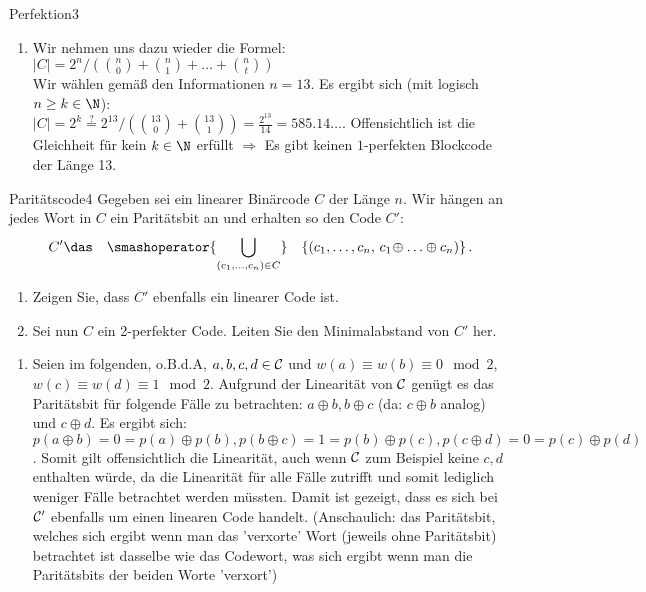 \begin{aufgabe}{Perfektion}{3}
\begin{enumerate}[label=\alph*)]
    \item Wir nehmen uns dazu wieder die Formel:  \\
    \(|C| = 2^n \Big/ \left(\binom{n}{0} + \binom{n}{1} + \ldots + \binom{n}{t}\right)\) \\
    Wir wählen gemäß den Informationen \(n=13\). Es ergibt sich (mit logisch \(n \geq k \in \N\)): \\
    \(|C| = 2^k \overset{?}{=} 2^{13} \Big/ \left(\binom{13}{0} + \binom{13}{1}\right) = \frac{2^{13}}{14} = 585.14 \ldots\). Offensichtlich ist die Gleichheit für kein \(k \in \N\) erfüllt \(\Rightarrow\) Es gibt keinen \(1\)-perfekten Blockcode der Länge 13. 
\end{enumerate}
\end{aufgabe}
\clearpage
\begin{aufgabe}{Paritätscode}{4}
Gegeben sei ein linearer Binärcode \(C\) der Länge \(n\). Wir hängen an jedes
Wort in \(C\) ein Paritätsbit an und erhalten so den Code \(C'\):
\[
    C' \das \quad\smashoperator{\bigcup_{\substack{(c_1,...,c_n)\in
    C}}}\quad \{(c_1,\dots,c_n,\,c_1\!\oplus \ldots \oplus c_n)\} \,.
\]
\begin{enumerate}[label=\alph*)]
\narrowitems
    \item Zeigen Sie, dass \(C'\) ebenfalls ein linearer Code ist.
    \item Sei nun \(C\) ein 2-perfekter Code.
        Leiten Sie den Minimalabstand von \(C'\) her.
\end{enumerate}
\Splitter
\begin{enumerate}[label=\alph*)]\narrowitems
    \item Seien im folgenden, o.B.d.A, \(a,b,c,d \in {\cal C}\) und \(w(a) \equiv w(b) \equiv 0 \mod 2\), \(w(c) \equiv w(d) \equiv 1 \mod 2\). Aufgrund der Linearität von \({\cal C}\) genügt es das Paritätsbit für folgende Fälle zu betrachten: \(a \oplus b, b \oplus c\) (da: \(c \oplus b\) analog) und \(c \oplus d\). Es ergibt sich:\\
    \(p(a\oplus b) = 0 = p(a) \oplus p(b), p(b \oplus c) = 1 = p(b) \oplus p(c), p(c \oplus d) = 0 = p(c) \oplus p(d)\). Somit gilt offensichtlich die Linearität, auch wenn \({\cal C}\) zum Beispiel keine \(c,d\) enthalten würde, da die Linearität für alle Fälle zutrifft und somit lediglich weniger Fälle betrachtet werden müssten. Damit ist gezeigt, dass es sich bei \({\cal C}'\) ebenfalls um einen linearen Code handelt. (Anschaulich: das Paritätsbit, welches sich ergibt wenn man das 'verxorte' Wort (jeweils ohne Paritätsbit) betrachtet ist dasselbe wie das Codewort, was sich ergibt wenn man die Paritätsbits der beiden Worte 'verxort')\hfill \qedsymbol

\end{enumerate}
\end{aufgabe}
